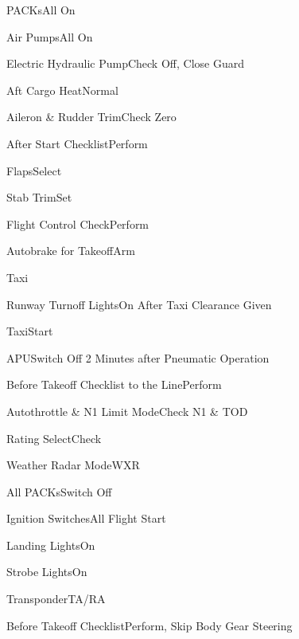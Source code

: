 \documentclass[sim-use, blue_items]{checklist}
\begin{document}
\begin{continuedchecklist}
	\item{PACKs}{All On}
	\item{Air Pumps}{All On}
	\item{Electric Hydraulic Pump}{Check Off, Close Guard}
	\item{Aft Cargo Heat}{Normal}
	\item{Aileron \& Rudder Trim}{Check Zero}
	\item{After Start Checklist}{Perform}
	\item{Flaps}{Select}
	\item{Stab Trim}{Set}
	\item{Flight Control Check}{Perform}
	\item{Autobrake for Takeoff}{Arm}
\end{continuedchecklist}

\begin{checklist}{Taxi}
	\item{Runway Turnoff Lights}{On After Taxi Clearance Given}
	\item{Taxi}{Start}
	\item{APU}{Switch Off 2 Minutes after Pneumatic Operation}
	\item{Before Takeoff Checklist to the Line}{Perform}
	 {
		\item{Autothrottle \& N1 Limit Mode}{Check N1 \& TOD}
		\item{Rating Select}{Check}
		\item{Weather Radar Mode}{WXR}
	}
	 {
		\item{All PACKs}{Switch Off}
		\item{Ignition Switches}{All Flight Start}
		\item{Landing Lights}{On}
		\item{Strobe Lights}{On}
		\item{Transponder}{TA/RA}
		\item{Before Takeoff Checklist}{Perform, Skip Body Gear Steering}
	}
\end{checklist}
\end{document}

